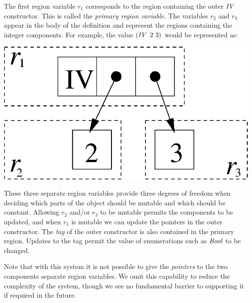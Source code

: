 
The first region variable $r_1$ corresponds to the region containing the outer $\operatorname{\mathit{IV}}$ constructor. This is called the \emph{primary region variable}. The variables $r_2$ and $r_3$ appear in the body of the definition and represent the regions containing the integer components. For example, the value $(\operatorname{\mathit{IV}} \ 2 \ 3)$ would be represented as:

\smallskip
\begin{center}
\includegraphics[scale=0.5]{2-System/fig/regions-intVector.eps}
\end{center}

These three separate region variables provide three degrees of freedom when deciding which parts of the object should be mutable and which should be constant. Allowing $r_2$ and/or $r_3$ to be mutable permits the components to be updated, and when $r_1$ is mutable we can update the pointers in the outer constructor. The \emph{tag} of the outer constructor is also contained in the primary region. Updates to the tag permit the value of enumerations such as $\operatorname{\mathit{Bool}}$ to be changed. 

Note that with this system it is not possible to give the \emph{pointers} to the two components separate region variables. We omit this capability to reduce the complexity of the system, though we see no fundamental barrier to supporting it if required in the future.




